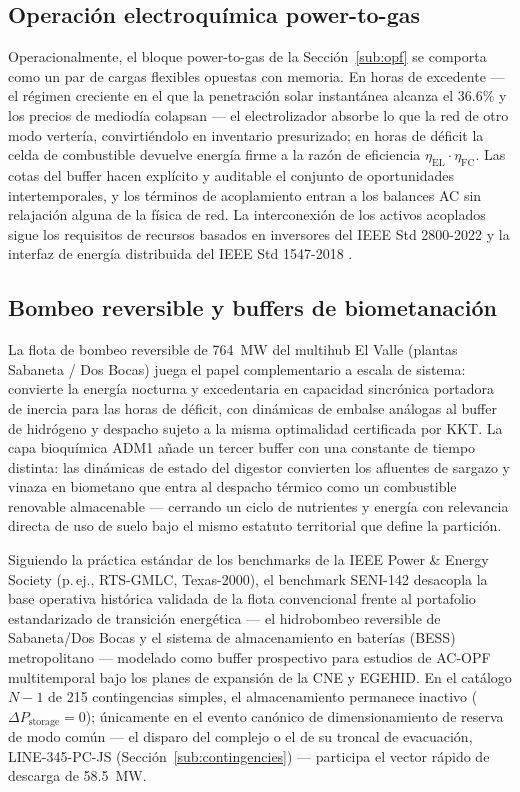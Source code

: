 \subsection{Operación electroquímica power-to-gas}
\label{sub:p2g}

Operacionalmente, el bloque power-to-gas de la Sección~\ref{sub:opf} se comporta como un par de cargas flexibles opuestas con memoria. En horas de excedente --- el régimen creciente en el que la penetración solar instantánea alcanza el 36.6\% y los precios de mediodía colapsan --- el electrolizador absorbe lo que la red de otro modo vertería, convirtiéndolo en inventario presurizado; en horas de déficit la celda de combustible devuelve energía firme a la razón de eficiencia $\eta_{\mathrm{EL}} \cdot \eta_{\mathrm{FC}}$. Las cotas del buffer hacen explícito y auditable el conjunto de oportunidades intertemporales, y los términos de acoplamiento entran a los balances AC sin relajación alguna de la física de red. La interconexión de los activos acoplados sigue los requisitos de recursos basados en inversores del IEEE Std 2800-2022 \cite{ieee2800} y la interfaz de energía distribuida del IEEE Std 1547-2018 \cite{ieee1547}.

\subsection{Bombeo reversible y buffers de biometanación}
\label{sub:phes}

La flota de bombeo reversible de 764~MW del multihub El Valle (plantas Sabaneta / Dos Bocas) juega el papel complementario a escala de sistema: convierte la energía nocturna y excedentaria en capacidad sincrónica portadora de inercia para las horas de déficit, con dinámicas de embalse análogas al buffer de hidrógeno y despacho sujeto a la misma optimalidad certificada por KKT. La capa bioquímica ADM1 añade un tercer buffer con una constante de tiempo distinta: las dinámicas de estado del digestor convierten los afluentes de sargazo y vinaza en biometano que entra al despacho térmico como un combustible renovable almacenable --- cerrando un ciclo de nutrientes y energía con relevancia directa de uso de suelo bajo el mismo estatuto territorial que define la partición.

Siguiendo la práctica estándar de los benchmarks de la IEEE Power \& Energy Society (p.\,ej., RTS-GMLC, Texas-2000), el benchmark SENI-142 desacopla la base operativa histórica validada de la flota convencional frente al portafolio estandarizado de transición energética --- el hidrobombeo reversible de Sabaneta/Dos Bocas y el sistema de almacenamiento en baterías (BESS) metropolitano --- modelado como buffer prospectivo para estudios de AC-OPF multitemporal bajo los planes de expansión de la CNE y EGEHID. En el catálogo $N-1$ de 215 contingencias simples, el almacenamiento permanece inactivo ($\Delta P_{\mathrm{storage}} = 0$); únicamente en el evento canónico de dimensionamiento de reserva de modo común --- el disparo del complejo o el de su troncal de evacuación, LINE-345-PC-JS (Sección~\ref{sub:contingencies}) --- participa el vector rápido de descarga de 58.5~MW.

